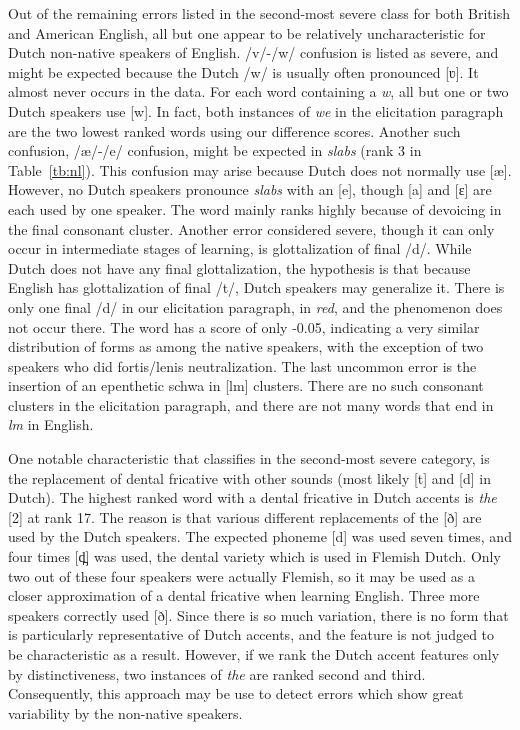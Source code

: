\documentclass[output=paper]{LSP/langsci}
\begin{document}
Out of the remaining errors listed in the second-most severe class for both British and American English, all but one appear to be relatively uncharacteristic for Dutch non-native speakers of English. /v/-/w/ confusion is listed as severe, and might be expected because the Dutch /w/ is usually often pronounced 
[ʋ]. It almost never occurs in the data. For each word containing a \textit{w}, all but one or two Dutch speakers use [w]. In fact, both instances of \textit{we} in the elicitation paragraph are the two lowest ranked words using our difference scores. Another such confusion, /æ/-/e/ confusion, might be expected in \textit{slabs} (rank 3 in Table~\ref{tb:nl}). This confusion may arise because Dutch does not normally use [æ]. However, no Dutch speakers pronounce \textit{slabs} with an [e], though [a] and [ɛ] are each used by one speaker. The word mainly ranks highly because of devoicing in the final consonant cluster. Another error considered severe, though it can only occur in intermediate stages of learning, is glottalization of final /d/. While Dutch does not have any final glottalization, the hypothesis is that because English has glottalization of final /t/, Dutch speakers may generalize it. There is only one final /d/ in our elicitation paragraph, in \textit{red}, and the phenomenon does not occur there. The word has a score of only -0.05, indicating a very similar distribution of forms as among the native speakers, with the exception of two speakers who did fortis/lenis neutralization. The last uncommon error is the insertion of an epenthetic schwa in [lm] clusters. There are no such consonant clusters in the elicitation paragraph, and there are not many words that end in \textit{lm} in English.

\largerpage 
One notable characteristic that \citet{van_den_doel_evaluation_2006} classifies in the second-most severe category, is the replacement of dental fricative with other sounds (most likely [t] and [d] in Dutch). The highest ranked word with a dental fricative in Dutch accents is \textit{the }[2] at rank 17. The reason is that various different replacements of the 
[ð] are used by the Dutch speakers. The expected phoneme [d] was used seven times, and four times [d̪] was used, the dental variety which is used in Flemish Dutch. Only two out of these four speakers were actually Flemish, so it may be used as a closer approximation of a dental fricative when learning English. Three more speakers correctly used [ð].
Since there is so much variation, there is no form that is particularly representative of Dutch accents, and the feature is not judged to be characteristic as a result. However, if we rank the Dutch accent features only by distinctiveness, two instances of \textit{the} are ranked second and third. Consequently, this approach may be use to detect errors which show great variability by the non-native speakers.
\end{document}
